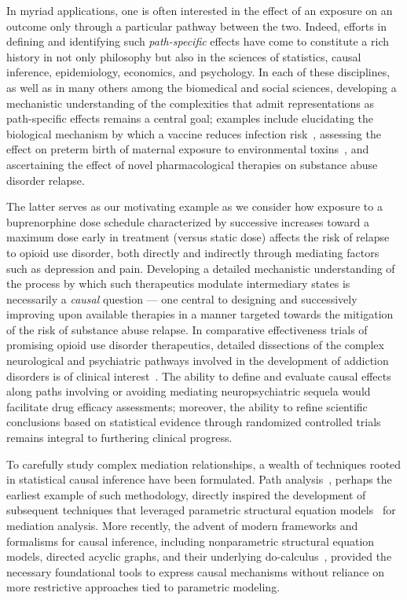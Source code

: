 In myriad applications, one is often interested in the effect of an exposure on
an outcome only through a particular pathway between the two. Indeed, efforts in
defining and identifying such \textit{path-specific} effects have come to
constitute a rich history in not only philosophy but also in the sciences of
statistics, causal inference, epidemiology, economics, and psychology. In each
of these disciplines, as well as in many others among the biomedical and social
sciences, developing a mechanistic understanding of the complexities that admit
representations as path-specific effects remains a central goal; examples
include elucidating the biological mechanism by which a vaccine reduces
infection risk~\citep[e.g.,][]{corey2015immune, hejazi2020efficient}, assessing
the effect on preterm birth of maternal exposure to environmental
toxins~\citep[e.g.,][]{ferguson2017mediation}, and ascertaining the effect of
novel pharmacological therapies on substance abuse disorder relapse.

The latter serves as our motivating example as we consider how exposure to
a buprenorphine dose schedule characterized by successive increases toward
a maximum dose early in treatment (versus static dose) affects the risk of
relapse to opioid use disorder, both directly and indirectly through mediating
factors such as depression and pain. Developing a detailed mechanistic
understanding of the process by which such therapeutics modulate intermediary
states is necessarily a \textit{causal} question --- one central to designing
and successively improving upon available therapies in a manner targeted towards
the mitigation of the risk of substance abuse relapse. In comparative
effectiveness trials of promising opioid use disorder therapeutics, detailed
dissections of the complex neurological and psychiatric pathways involved in the
development of addiction disorders is of clinical
interest~\citep{lee2018comparative, rudolph2020explaining}. The ability to
define and evaluate causal effects along paths involving or avoiding mediating
neuropsychiatric sequela would facilitate drug efficacy assessments; moreover,
the ability to  refine scientific conclusions based on statistical evidence
through randomized controlled trials remains integral to furthering clinical
progress.

To carefully study complex mediation relationships, a wealth of techniques
rooted in statistical causal inference have been formulated. Path
analysis~\citep{wright1921correlation, wright1934method}, perhaps the earliest
example of such methodology, directly inspired the development of subsequent
techniques that leveraged parametric structural equation
models~\citep[e.g.,][]{goldberger1972structural, baron1986moderator} for
mediation analysis. More
recently, the advent of modern frameworks and formalisms for causal inference,
including nonparametric structural equation models, directed acyclic graphs,
and their underlying do-calculus~\citep{pearl1995causal, pearl2009causality},
provided the necessary foundational tools to express causal mechanisms without
reliance on more restrictive approaches tied to parametric modeling.

